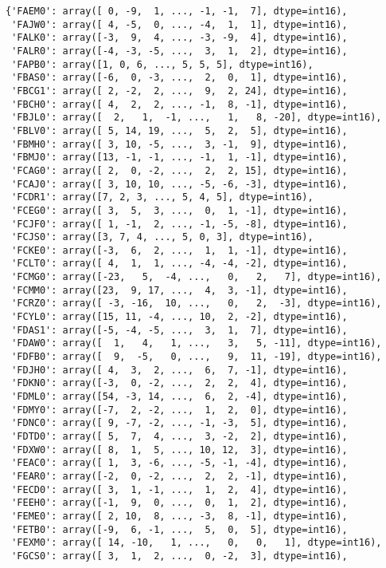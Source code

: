 \documentclass[11pt]{article}
\begin{document}
    
    \begin{verbatim}
{'FAEM0': array([ 0, -9,  1, ..., -1, -1,  7], dtype=int16),
 'FAJW0': array([ 4, -5,  0, ..., -4,  1,  1], dtype=int16),
 'FALK0': array([-3,  9,  4, ..., -3, -9,  4], dtype=int16),
 'FALR0': array([-4, -3, -5, ...,  3,  1,  2], dtype=int16),
 'FAPB0': array([1, 0, 6, ..., 5, 5, 5], dtype=int16),
 'FBAS0': array([-6,  0, -3, ...,  2,  0,  1], dtype=int16),
 'FBCG1': array([ 2, -2,  2, ...,  9,  2, 24], dtype=int16),
 'FBCH0': array([ 4,  2,  2, ..., -1,  8, -1], dtype=int16),
 'FBJL0': array([  2,   1,  -1, ...,   1,   8, -20], dtype=int16),
 'FBLV0': array([ 5, 14, 19, ...,  5,  2,  5], dtype=int16),
 'FBMH0': array([ 3, 10, -5, ...,  3, -1,  9], dtype=int16),
 'FBMJ0': array([13, -1, -1, ..., -1,  1, -1], dtype=int16),
 'FCAG0': array([ 2,  0, -2, ...,  2,  2, 15], dtype=int16),
 'FCAJ0': array([ 3, 10, 10, ..., -5, -6, -3], dtype=int16),
 'FCDR1': array([7, 2, 3, ..., 5, 4, 5], dtype=int16),
 'FCEG0': array([ 3,  5,  3, ...,  0,  1, -1], dtype=int16),
 'FCJF0': array([ 1, -1,  2, ..., -1, -5, -8], dtype=int16),
 'FCJS0': array([3, 7, 4, ..., 5, 0, 3], dtype=int16),
 'FCKE0': array([-3,  6,  2, ...,  1,  1, -1], dtype=int16),
 'FCLT0': array([ 4,  1,  1, ..., -4, -4, -2], dtype=int16),
 'FCMG0': array([-23,   5,  -4, ...,   0,   2,   7], dtype=int16),
 'FCMM0': array([23,  9, 17, ...,  4,  3, -1], dtype=int16),
 'FCRZ0': array([ -3, -16,  10, ...,   0,   2,  -3], dtype=int16),
 'FCYL0': array([15, 11, -4, ..., 10,  2, -2], dtype=int16),
 'FDAS1': array([-5, -4, -5, ...,  3,  1,  7], dtype=int16),
 'FDAW0': array([  1,   4,   1, ...,   3,   5, -11], dtype=int16),
 'FDFB0': array([  9,  -5,   0, ...,   9,  11, -19], dtype=int16),
 'FDJH0': array([ 4,  3,  2, ...,  6,  7, -1], dtype=int16),
 'FDKN0': array([-3,  0, -2, ...,  2,  2,  4], dtype=int16),
 'FDML0': array([54, -3, 14, ...,  6,  2, -4], dtype=int16),
 'FDMY0': array([-7,  2, -2, ...,  1,  2,  0], dtype=int16),
 'FDNC0': array([ 9, -7, -2, ..., -1, -3,  5], dtype=int16),
 'FDTD0': array([ 5,  7,  4, ...,  3, -2,  2], dtype=int16),
 'FDXW0': array([ 8,  1,  5, ..., 10, 12,  3], dtype=int16),
 'FEAC0': array([ 1,  3, -6, ..., -5, -1, -4], dtype=int16),
 'FEAR0': array([-2,  0, -2, ...,  2,  2, -1], dtype=int16),
 'FECD0': array([ 3,  1, -1, ...,  1,  2,  4], dtype=int16),
 'FEEH0': array([-1,  9,  0, ...,  0,  1,  2], dtype=int16),
 'FEME0': array([ 2, 10,  8, ..., -3,  8, -1], dtype=int16),
 'FETB0': array([-9,  6, -1, ...,  5,  0,  5], dtype=int16),
 'FEXM0': array([ 14, -10,   1, ...,   0,   0,   1], dtype=int16),
 'FGCS0': array([ 3,  1,  2, ...,  0, -2,  3], dtype=int16),

\end{verbatim}
\end{document}
